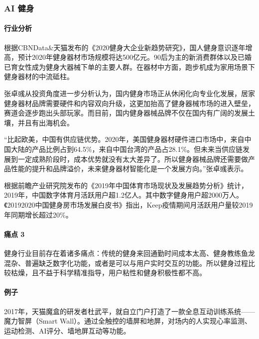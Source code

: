 \documentclass[letterpaper,10pt,english]{sphinxmanual}
\begin{document}
\subsubsection{AI 健身}
\label{\detokenize{chapter_project/AI_fit:ai}}\label{\detokenize{chapter_project/AI_fit::doc}}

\paragraph{行业分析}
\label{\detokenize{chapter_project/AI_fit:id1}}
根据CBNData\&天猫发布的《2020健身大企业新趋势研究》，国人健身意识逐年增高，预计2020年健身器材市场规模将达500亿元。90后为主的新消费群体以及已婚已育女性成为健身大器械下单的主要人群。在器材中方面，跑步机成为家用场景下健身器材的中流砥柱。

张卓彧从投资角度进一步分析认为，国内健身市场正从休闲化向专业化发展，居家健身器材品牌需要硬件和内容双向升级，这更加抬高了健身器械市场的进入壁垒，赛道会逐步跑出头部玩家。而目前，国内健身器械品牌不仅在国内有广阔的发展土壤，并且有出海机会。

“比起欧美，中国有供应链优势。2020年，美国健身器材硬件进口市场中，来自中国大陆的产品比例占到64.5\%，来自中国台湾的产品占28.1\%。但未来当供应链发展到一定成熟阶段时，成本优势就没有太大差异了。所以健身器械品牌还需要做产品性能的提升和品牌溢价，未来健身器材智能化是一个发展方向。”张卓彧表示。

根据前瞻产业研究院发布的《2019年中国体育市场现状及发展趋势分析》统计，2019年，中国数字体育月活跃用户超1.2亿人。其中数字健身用户超2000万人。《2019\sphinxhyphen{}2020中国健身房市场发展白皮书》指出，Keep疫情期间月活跃用户量较2019年同期增长超过20\%。


\paragraph{痛点 3\sphinxfootnotemark[757]}
\label{\detokenize{chapter_project/AI_fit:id2}}%
\begin{footnotetext}[757]\sphinxAtStartFootnote
{}
%
\end{footnotetext}\ignorespaces 
健身行业目前存在着诸多痛点：传统的健身来回通勤时间成本太高、健身教练鱼龙混杂、普遍缺乏数字化功能，或者是可以与用户实时交互的功能。所以健身过程比较枯燥，且不益于科学精准指导，用户粘性和健身积极性都不高。


\paragraph{例子}
\label{\detokenize{chapter_project/AI_fit:id3}}
2017年，天猫魔盒的研发者杜武平，就自立门户打造了一款全息互动训练系统——魔力智屏（Smart
Wall）。通过全触控的墙屏和地屏，对场内的人实现心率监测、运动检测、AI评分、墙地屏互动等功能。
\end{document}
